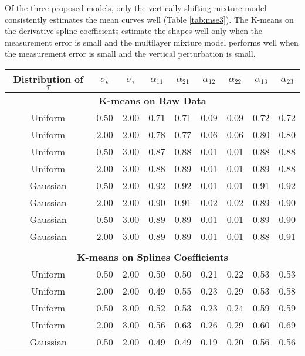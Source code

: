  Of the three proposed models, only the vertically shifting mixture model consistently estimates the mean curves well (Table \ref{tab:mse3}). The K-means on the derivative spline coefficients estimate the shapes well only when the measurement error is small and the multilayer mixture model performs well when the measurement error is small and the vertical perturbation is small. \\

\begin{table}[ht]
\begin{center}
\begin{tabular}{ccc|cccccc}
  \hline Distribution of $\tau$&$\sigma_{\epsilon}$&$\sigma_{\tau}$&$\alpha_{11}$&$\alpha_{21}$&$\alpha_{12}$&$\alpha_{22}$&$\alpha_{13}$&$\alpha_{23}$\\ \hline\multicolumn{9}{c}{\textbf{K-means on Raw Data}}\\ Uniform & 0.50 & 2.00 & 0.71 & 0.71 & 0.09 & 0.09 & 0.72 & 0.72 \\ 
  Uniform & 2.00 & 2.00 & 0.78 & 0.77 & 0.06 & 0.06 & 0.80 & 0.80 \\ 
  Uniform & 0.50 & 3.00 & 0.87 & 0.88 & 0.01 & 0.01 & 0.88 & 0.88 \\ 
  Uniform & 2.00 & 3.00 & 0.88 & 0.89 & 0.01 & 0.01 & 0.89 & 0.88 \\ 
  Gaussian & 0.50 & 2.00 & 0.92 & 0.92 & 0.01 & 0.01 & 0.91 & 0.92 \\ 
  Gaussian & 2.00 & 2.00 & 0.90 & 0.91 & 0.02 & 0.02 & 0.89 & 0.90 \\ 
  Gaussian & 0.50 & 3.00 & 0.89 & 0.89 & 0.01 & 0.01 & 0.89 & 0.90 \\ 
  Gaussian & 2.00 & 3.00 & 0.89 & 0.89 & 0.01 & 0.01 & 0.88 & 0.91 \\ 
   \\ \multicolumn{9}{c}{\textbf{K-means on Splines Coefficients}}\\Uniform & 0.50 & 2.00 & 0.50 & 0.50 & 0.21 & 0.22 & 0.53 & 0.53 \\ 
  Uniform & 2.00 & 2.00 & 0.49 & 0.55 & 0.23 & 0.29 & 0.53 & 0.58 \\ 
  Uniform & 0.50 & 3.00 & 0.52 & 0.53 & 0.23 & 0.24 & 0.59 & 0.59 \\ 
  Uniform & 2.00 & 3.00 & 0.56 & 0.63 & 0.26 & 0.29 & 0.60 & 0.69 \\ 
  Gaussian & 0.50 & 2.00 & 0.49 & 0.49 & 0.19 & 0.20 & 0.56 & 0.56 \\ 

\end{tabular}
\end{center}
\end{table}
